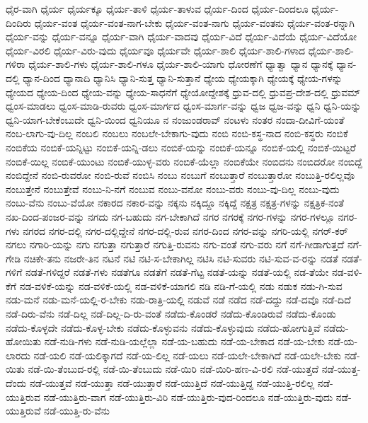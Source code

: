 {ಧೈರ-ವಾಗಿ
ಧೈರ್ಯ
ಧೈರ್ಯಕ್ಕೂ
ಧೈರ್ಯ-ತಾಳಿ
ಧೈರ್ಯ-ತಾಳುವ
ಧೈರ್ಯ-ದಿಂದ
ಧೈರ್ಯ-ದಿಂದಲೂ
ಧೈರ್ಯ-ದಿಂದಿರು
ಧೈರ್ಯ-ವಂತ
ಧೈರ್ಯ-ವಂತ-ನಾಗ-ಬೇಕು
ಧೈರ್ಯ-ವಂತ-ನಾಗು
ಧೈರ್ಯ-ವಂತನು
ಧೈರ್ಯ-ವಂತ-ರನ್ನಾಗಿ
ಧೈರ್ಯ-ವನ್ನು
ಧೈರ್ಯ-ವನ್ನೂ
ಧೈರ್ಯ-ವಾಗಿ
ಧೈರ್ಯ-ವಾದವು
ಧೈರ್ಯ-ವಿದೆ
ಧೈರ್ಯ-ವಿದೆಯೆ
ಧೈರ್ಯ-ವಿದೆಯೋ
ಧೈರ್ಯ-ವಿರಲಿ
ಧೈರ್ಯ-ವಿರು-ವುದು
ಧೈರ್ಯವೂ
ಧೈರ್ಯವೇ
ಧೈರ್ಯ-ಶಾಲಿ
ಧೈರ್ಯ-ಶಾಲಿ-ಗಳಾದ
ಧೈರ್ಯ-ಶಾಲಿ-ಗಳಿರಾ
ಧೈರ್ಯ-ಶಾಲಿ-ಗಳು
ಧೈರ್ಯ-ಶಾಲಿ-ಗಳೂ
ಧೈರ್ಯ-ಶಾಲಿ-ಯಾಗು
ಧೋರಣೆಗೆ
ಧ್ಯಾತ್ವಾ
ಧ್ಯಾನ
ಧ್ಯಾನಕ್ಕೆ
ಧ್ಯಾನ-ದಲ್ಲಿ
ಧ್ಯಾನ-ದಿಂದ
ಧ್ಯಾನಾದಿ
ಧ್ಯಾನಿಸಿ
ಧ್ಯಾನಿ-ಸುತ್ತ
ಧ್ಯಾನಿ-ಸುತ್ತಾನೆ
ಧ್ಯೇಯ
ಧ್ಯೇಯಕ್ಕಾಗಿ
ಧ್ಯೇಯಕ್ಕೆ
ಧ್ಯೇಯ-ಗಳನ್ನು
ಧ್ಯೇಯದ
ಧ್ಯೇಯ-ದಿಂದ
ಧ್ಯೇಯ-ವನ್ನು
ಧ್ಯೇಯ-ಸಾಧನೆಗೆ
ಧ್ಯೇಯೋದ್ದೇಶಕ್ಕೆ
ಧ್ರುವ-ದಲ್ಲಿ
ಧ್ರುವಪ್ರ-ದೇಶ-ದಲ್ಲಿ
ಧ್ರುವಮ್
ಧ್ವಂಸ-ಮಾಡಲು
ಧ್ವಂಸ-ಮಾಡಿ-ರುವರು
ಧ್ವಂಸ-ಮಾರ್ಗದ
ಧ್ವಂಸ-ಮಾರ್ಗ-ವನ್ನು
ಧ್ವಜ
ಧ್ವಜ-ವನ್ನು
ಧ್ವನಿ
ಧ್ವನಿ-ಯನ್ನು
ಧ್ವನಿ-ಯಾಗ-ಬೇಕೆಂಬುದೇ
ಧ್ವನಿ-ಯಿಂದ
ಧ್ವನಿಯೂ
ನ
ನಂಜುಂಡರಾವ್
ನಂಟಳು
ನಂತರ
ನಂದಾ-ದೀವಿಗೆ-ಯಂತೆ
ನಂಬ-ಲಾಗು-ವು-ದಿಲ್ಲ
ನಂಬಲಿ
ನಂಬಲು
ನಂಬಲೇ-ಬೇಕಾಗು-ವುದು
ನಂಬಿ
ನಂಬಿ-ಕಸ್ಥ-ನಾದ
ನಂಬಿ-ಕಸ್ಥರು
ನಂಬಿಕೆ
ನಂಬಿಕೆಯ
ನಂಬಿಕೆ-ಯನ್ನಿಟ್ಟು
ನಂಬಿಕೆ-ಯನ್ನಿ-ಡಲು
ನಂಬಿಕೆ-ಯನ್ನು
ನಂಬಿಕೆ-ಯನ್ನೂ
ನಂಬಿಕೆ-ಯಲ್ಲಿ
ನಂಬಿಕೆ-ಯಿಟ್ಟರೆ
ನಂಬಿಕೆ-ಯಿಲ್ಲ
ನಂಬಿಕೆ-ಯುಂಟು
ನಂಬಿಕೆ-ಯುಳ್ಳ-ವರು
ನಂಬಿಕೆ-ಯೆಲ್ಲಾ
ನಂಬಿಕೆಯೇ
ನಂಬಿದನು
ನಂಬಿದರೋ
ನಂಬಿದ್ದೆ
ನಂಬಿದ್ದೇನೆ
ನಂಬಿ-ರುವರೋ
ನಂಬಿ-ರುವೆ
ನಂಬಿಸಿ
ನಂಬು
ನಂಬುಗೆ
ನಂಬುತ್ತಾರೆ
ನಂಬುತ್ತಾರೋ
ನಂಬುತ್ತಿ-ರಲಿಲ್ಲವೊ
ನಂಬುತ್ತೇನೆ
ನಂಬುತ್ತೇವೆ
ನಂಬು-ನಿ-ನಗೆ
ನಂಬುವ
ನಂಬು-ವನೋ
ನಂಬು-ವರು
ನಂಬು-ವು-ದಿಲ್ಲ
ನಂಬು-ವುದು
ನಂಬು-ವೆನು
ನಂಬು-ವೆಯೋ
ನಕಾರದ
ನಕಾರ-ವನ್ನು
ನಕ್ಕನು
ನಕ್ಕಿದ್ದೂ
ನಕ್ಕಿದ್ದೆ
ನಕ್ಷತ್ರ
ನಕ್ಷತ್ರ-ಗಳನ್ನು
ನಕ್ಷತ್ರಿಕ-ನಂತೆ
ನಖ-ದಿಂದ-ಪಂಜರ-ವನ್ನು
ನಗದು
ನಗ-ಬಹುದು
ನಗ-ಬೇಕಾಗಿದೆ
ನಗರ
ನಗರಕ್ಕೆ
ನಗರ-ಗಳನ್ನು
ನಗರ-ಗಳಲ್ಲೂ
ನಗರ-ಗಳು
ನಗರದ
ನಗರ-ದಲ್ಲಿ
ನಗರ-ದಲ್ಲಿದ್ದೇನೆ
ನಗರ-ದಲ್ಲಿ-ರುವ
ನಗರ-ದಿಂದ
ನಗರ-ವನ್ನು
ನಗರಿ-ಯಲ್ಲಿ
ನಗರ್-ಕರ್
ನಗಲು
ನಗಾರಿ-ಯನ್ನು
ನಗು
ನಗುತ್ತಾ
ನಗುತ್ತಾರೆ
ನಗುತ್ತಿ-ರುವನು
ನಗು-ವಂತೆ
ನಗು-ವರು
ನಗೆ
ನಗೆ-ಗೀಡಾಗುತ್ತದೆ
ನಗೆ-ಗೇಡಿ
ನಚಿಕೇ-ತನು
ನಜರೇ-ತಿನ
ನಟನೆ
ನಟಿ
ನಟಿ-ಸ-ಬೇಕಾಗಿಲ್ಲ
ನಟಿಸಿ
ನಟಿ-ಸುವರು
ನಟಿ-ಸುವ-ವ-ರನ್ನು
ನಡತೆ
ನಡತೆ-ಗಳಿಗೆ
ನಡತೆ-ಗಳಿದ್ದರೆ
ನಡತೆ-ಗಳು
ನಡತೆಗೂ
ನಡತೆಗೆ
ನಡತೆ-ಗೆಟ್ಟ
ನಡತೆ-ಯನ್ನು
ನಡತೆ-ಯಲ್ಲಿ
ನಡ-ತೆಯೇ
ನಡ-ವಳಿ-ಕೆಗೆ
ನಡ-ವಳಿಕೆ-ಯನ್ನು
ನಡ-ವಳಿಕೆ-ಯಲ್ಲಿ
ನಡ-ವಳಿಕೆ-ಯಾಗಲಿ
ನಡಿ
ನಡಿ-ಗೆ-ಯಲ್ಲಿ
ನಡು
ನಡುಕ
ನಡು-ಗಿ-ಸುವ
ನಡು-ಮನೆ
ನಡು-ಮನೆ-ಯಲ್ಲಿ-ರ-ಬೇಕು
ನಡು-ರಾತ್ರಿ-ಯಲ್ಲಿ
ನಡುವೆ
ನಡೆ
ನಡೆದ
ನಡೆ-ದದ್ದು
ನಡೆ-ದವೊ
ನಡೆ-ದಿದೆ
ನಡೆ-ದಿರು-ವೆನು
ನಡೆ-ದಿಲ್ಲ
ನಡೆ-ದಿಲ್ಲ-ದಿ-ರು-ವಂತೆ
ನಡೆದು-ಕೊಂಡರೆ
ನಡೆದು-ಕೊಂಡಿರುವೆ
ನಡೆದು-ಕೊಂಡು
ನಡೆದು-ಕೊಳ್ಳದೇ
ನಡೆದು-ಕೊಳ್ಳ-ಬೇಕು
ನಡೆದು-ಕೊಳ್ಳುವನು
ನಡೆದು-ಕೊಳ್ಳುವುದು
ನಡೆದು-ಹೋಗುತ್ತಿವೆ
ನಡೆದು-ಹೋಯಿತು
ನಡೆ-ನುಡಿ-ಗಳು
ನಡೆ-ನುಡಿ-ಯಲ್ಲೆಲ್ಲಾ
ನಡೆ-ಯ-ಬಹುದು
ನಡೆ-ಯ-ಬೇಕಾದ
ನಡೆ-ಯ-ಬೇಕು
ನಡೆ-ಯ-ಲಾರದು
ನಡೆ-ಯಲಿ
ನಡೆ-ಯಲಿಕ್ಕಾಗದೆ
ನಡೆ-ಯ-ಲಿಲ್ಲ
ನಡೆ-ಯಲು
ನಡೆ-ಯಲೇ-ಬೇಕಾಗಿದೆ
ನಡೆ-ಯಲೇ-ಬೇಕು
ನಡೆ-ಯಿತು
ನಡೆ-ಯಿ-ತೆಂಬುದ-ರಲ್ಲಿ
ನಡೆ-ಯಿ-ತೆಂಬುದು
ನಡೆ-ಯಿರಿ
ನಡೆ-ಯಿರಿ-ಹಣ-ವಿ-ರಲಿ
ನಡೆ-ಯುತ್ತದೆ
ನಡೆ-ಯುತ್ತ-ದೆಂದು
ನಡೆ-ಯುತ್ತವೆ
ನಡೆ-ಯುತ್ತಾ
ನಡೆ-ಯುತ್ತಾರೆ
ನಡೆ-ಯುತ್ತಿದೆ
ನಡೆ-ಯುತ್ತಿದ್ದ
ನಡೆ-ಯುತ್ತಿ-ರಲಿಲ್ಲ
ನಡೆ-ಯುತ್ತಿರುವ
ನಡೆ-ಯುತ್ತಿರು-ವಾಗ
ನಡೆ-ಯುತ್ತಿರು-ವಿರಿ
ನಡೆ-ಯುತ್ತಿರು-ವುದ-ರಿಂದಲೂ
ನಡೆ-ಯುತ್ತಿರು-ವುದು
ನಡೆ-ಯುತ್ತಿರುವೆ
ನಡೆ-ಯುತ್ತಿ-ರು-ವೆನು
}
